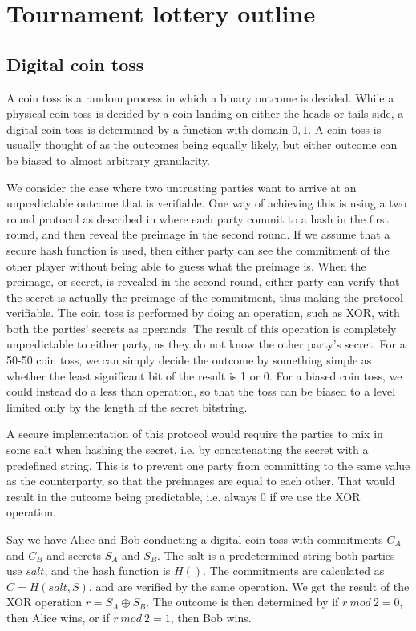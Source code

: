 \section{Tournament lottery outline}
\label{sec:outline}

\subsection{Digital coin toss}

A coin toss is a random process in which a binary outcome is decided. While a physical coin toss is decided by a coin landing on either the heads or tails side, a digital coin toss is determined by a function with domain ${0, 1}$. A coin toss is usually thought of as the outcomes being equally likely, but either outcome can be biased to almost arbitrary granularity.

We consider the case where two untrusting parties want to arrive at an unpredictable outcome that is verifiable. One way of achieving this is using a two round protocol as described in \cite{blum1983coin} where each party commit to a hash in the first round, and then reveal the preimage in the second round. If we assume that a secure hash function is used, then either party can see the commitment of the other player without being able to guess what the preimage is. When the preimage, or secret, is revealed in the second round, either party can verify that the secret is actually the preimage of the commitment, thus making the protocol verifiable. The coin toss is performed by doing an operation, such as XOR, with both the parties' secrets as operands. The result of this operation is completely unpredictable to either party, as they do not know the other party's secret. For a 50-50 coin toss, we can simply decide the outcome by something simple as whether the least significant bit of the result is 1 or 0. For a biased coin toss, we could instead do a less than operation, so that the toss can be biased to a level limited only by the length of the secret bitstring.

A secure implementation of this protocol would require the parties to mix in some salt when hashing the secret, i.e. by concatenating the secret with a predefined string. This is to prevent one party from committing to the same value as the counterparty, so that the preimages are equal to each other. That would result in the outcome being predictable, i.e. always 0 if we use the XOR operation. 

Say we have Alice and Bob conducting a digital coin toss with commitments $C_A$ and $C_B$ and secrets $S_A$ and $S_B$. The salt is a predetermined string both parties use $salt$, and the hash function is $H()$. The commitments are calculated as $C=H(salt, S)$, and are verified by the same operation. We get the result of the XOR operation $r=S_A \oplus S_B$. The outcome is then determined by if $r\ mod\ 2 = 0$, then Alice wins, or if $r\ mod\ 2 = 1$, then Bob wins.

